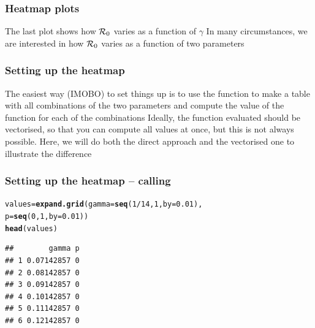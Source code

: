 \documentclass[aspectratio=169]{beamer}\usepackage[]{graphicx}\usepackage[]{xcolor}
\makeatletter
\newcommand{\hlnum}[1]{\textcolor[rgb]{0.686,0.059,0.569}{#1}}%
\newcommand{\hlopt}[1]{\textcolor[rgb]{0,0,0}{#1}}%
\newcommand{\hldef}[1]{\textcolor[rgb]{0.345,0.345,0.345}{#1}}%
\newcommand{\hlkwb}[1]{\textcolor[rgb]{0.69,0.353,0.396}{#1}}%
\newcommand{\hlkwc}[1]{\textcolor[rgb]{0.333,0.667,0.333}{#1}}%
\newcommand{\hlkwd}[1]{\textcolor[rgb]{0.737,0.353,0.396}{\textbf{#1}}}%
\newenvironment{kframe}{%
 \def\at@end@of@kframe{}%
 \ifinner\ifhmode%
  \def\at@end@of@kframe{\end{minipage}}%
  \begin{minipage}{\columnwidth}%
 \fi\fi%
 \def\FrameCommand##1{\hskip\@totalleftmargin \hskip-\fboxsep
 \colorbox{shadecolor}{##1}\hskip-\fboxsep
     \hskip-\linewidth \hskip-\@totalleftmargin \hskip\columnwidth}%
 \MakeFramed {\advance\hsize-\width
   \@totalleftmargin\z@ \linewidth\hsize
   \@setminipage}}%
 {\par\unskip\endMakeFramed%
 \at@end@of@kframe}
\newenvironment{knitrout}{}{} %
\makeatother
\begin{document}
\begin{frame}\frametitle{Heatmap plots}
The last plot shows how $\mathcal{R}_0$ varies as a function of $\gamma$
\vfill
In many circumstances, we are interested in how $\mathcal{R}_0$ varies as a function of two parameters
\end{frame}


\begin{frame}\frametitle{Setting up the heatmap}
The easiest way (IMOBO) to set things up is to use the function  to make a table with all combinations of the two parameters and compute the value of the function for each of the combinations
\vfill
Ideally, the function evaluated should be vectorised, so that you can compute all values at once, but this is not always possible. Here, we will do both the direct approach and the vectorised one to illustrate the difference
\end{frame}

\begin{frame}[fragile]\frametitle{Setting up the heatmap -- calling }
\begin{knitrout}
\color{fgcolor}\begin{kframe}
\begin{alltt}
\hldef{values} \hlkwb{=} \hlkwd{expand.grid}\hldef{(}\hlkwc{gamma} \hldef{=} \hlkwd{seq}\hldef{(}\hlnum{1}\hlopt{/}\hlnum{14}\hldef{,} \hlnum{1}\hldef{,} \hlkwc{by}\hldef{=}\hlnum{0.01}\hldef{),}
                     \hlkwc{p} \hldef{=} \hlkwd{seq}\hldef{(}\hlnum{0}\hldef{,} \hlnum{1}\hldef{,} \hlkwc{by} \hldef{=} \hlnum{0.01}\hldef{))}
\hlkwd{head}\hldef{(values)}
\end{alltt}
\begin{verbatim}
##        gamma p
## 1 0.07142857 0
## 2 0.08142857 0
## 3 0.09142857 0
## 4 0.10142857 0
## 5 0.11142857 0
## 6 0.12142857 0
\end{verbatim}
\end{kframe}
\end{knitrout}
\end{frame}
\end{document}
